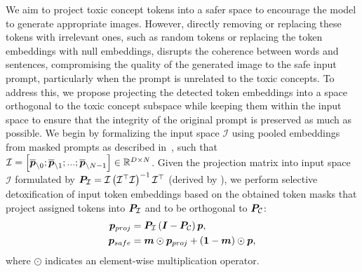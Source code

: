 We aim to project toxic concept tokens into a safer space to encourage the model to generate appropriate images. However, directly removing or replacing these tokens with irrelevant ones, such as random tokens or replacing the token embeddings with null embeddings, disrupts the coherence between words and sentences, compromising the quality of the generated image to the safe input prompt, particularly when the prompt is unrelated to the toxic concepts. To address this, we propose projecting the detected token embeddings into a space orthogonal to the toxic concept subspace while keeping them within the input space to ensure that the integrity of the original prompt is preserved as much as possible.
We begin by formalizing the input space \(\mathcal{I}\) using pooled embeddings from masked prompts as described in~, such that
$\mathcal{I}=\left[\overline{\boldsymbol{p}}_{\backslash 0}; \overline{\boldsymbol{p}}_{\backslash 1}; ...; \overline{\boldsymbol{p}}_{\backslash N-1}\right]\in\mathbb{R}^{D\times N}$. 
Given the projection matrix into input space $\mathcal{I}$ formulated by $\boldsymbol{P}_\mathcal{I}=\mathcal{I}\left({\mathcal{I}}^\top\mathcal{I}\right)^{-1}{\mathcal{I}}^\top$ (derived by ), we perform selective detoxification of input token embeddings based on the obtained token masks that project assigned tokens into $\boldsymbol{P}_{\mathcal{I}}$ and to be orthogonal to $\boldsymbol{P}_{\mathcal{C}}$:
\begin{equation}
\begin{split}
\boldsymbol{p}_{proj}&=\boldsymbol{P}_{\mathcal{I}}\left(\boldsymbol{I}-\boldsymbol{P}_{\mathcal{C}}\right)\boldsymbol{p},\\
\boldsymbol{p}_{safe}&=\boldsymbol{m}\odot\boldsymbol{p}_{proj}+(\boldsymbol{1}-\boldsymbol{m})\odot\boldsymbol{p},
\end{split}
\end{equation}
where $\odot$ indicates an element-wise multiplication operator. 


